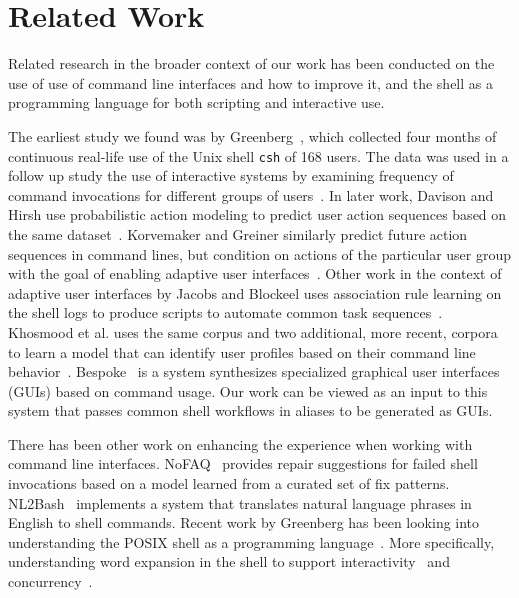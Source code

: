 \section{Related Work}

Related research in the broader context of our work has been conducted on the use of use of command line interfaces and how to improve it, and the shell as a programming language for both scripting and interactive use. 

The earliest study we found was by Greenberg~\cite{greenberg:88a}, which collected four months of continuous real-life use of the Unix shell \verb|csh| of 168 users. 
The data was used in a follow up study the use of interactive systems by examining frequency of command invocations for different groups of users~\cite{greenberg:88b}.
In later work, Davison and Hirsh use probabilistic action modeling to predict user action sequences based on the same dataset~\cite{davison:98}.
Korvemaker and Greiner similarly predict future action sequences in command lines, but condition on actions of the particular user group with the goal of enabling adaptive user interfaces~\cite{korvemaker:00}.
Other work in the context of adaptive user interfaces by Jacobs and Blockeel uses association rule learning on the shell logs to produce scripts to automate common task sequences~\cite{jacobs:01}.
Khosmood et al. uses the same corpus and two additional, more recent, corpora to learn a model that can identify user profiles based on their command line behavior~\cite{khosmood:14}.
Bespoke~\cite{bespoke:19} is a system synthesizes specialized graphical user interfaces (GUIs) based on command usage.
Our work can be viewed as an input to this system that passes common shell workflows in aliases to be generated as GUIs.

There has been other work on enhancing the experience when working with command line interfaces.
NoFAQ~\cite{dantoni:17} provides repair suggestions for failed shell invocations based on a model learned from a curated set of fix patterns.
NL2Bash~\cite{lin:18} implements a system that translates natural language phrases in English to shell commands.
Recent work by Greenberg has been looking into understanding the POSIX shell as a programming language~\cite{greenberg:17}.
More specifically, understanding word expansion in the shell to support interactivity~\cite{greenberg:18a} and concurrency~\cite{greenberg:18b}.
